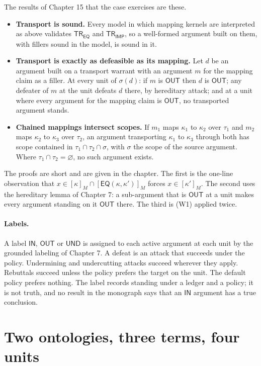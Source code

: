 \documentclass[11pt]{article}
\newcommand{\IN}{\textsf{IN}}
\newcommand{\UND}{\textsf{UND}}
\newcommand{\OUT}{\textsf{OUT}}
\newcommand{\EQ}{\mathsf{EQ}}
\newcommand{\IMP}{\mathsf{IMP}}
\newcommand{\TR}{\mathsf{TR}}
\newcommand{\ext}[2]{[#1]_{#2}}
\begin{document}
The results of Chapter 15 that the case exercises are these.
\begin{itemize}[nosep]
\item \textbf{Transport is sound.} Every model in which mapping kernels are interpreted as above validates $\TR_{\EQ}$ and $\TR_{\IMP}$, so a well-formed argument built on them, with fillers sound in the model, is sound in it.
\item \textbf{Transport is exactly as defeasible as its mapping.} Let $d$ be an argument built on a transport warrant with an argument $m$ for the mapping claim as a filler. At every unit of $\sigma(d)$: if $m$ is $\OUT$ then $d$ is $\OUT$; any defeater of $m$ at the unit defeats $d$ there, by hereditary attack; and at a unit where every argument for the mapping claim is $\OUT$, no transported argument stands.
\item \textbf{Chained mappings intersect scopes.} If $m_1$ maps $\kappa_1$ to $\kappa_2$ over $\tau_1$ and $m_2$ maps $\kappa_2$ to $\kappa_3$ over $\tau_2$, an argument transporting $\kappa_1$ to $\kappa_3$ through both has scope contained in $\tau_1\cap\tau_2\cap\sigma$, with $\sigma$ the scope of the source argument. Where $\tau_1\cap\tau_2=\varnothing$, no such argument exists.
\end{itemize}
The proofs are short and are given in the chapter. The first is the one-line observation that $x\in\ext{\kappa}{M}\cap\ext{\EQ(\kappa,\kappa')}{M}$ forces $x\in\ext{\kappa'}{M}$. The second uses the hereditary lemma of Chapter 7: a sub-argument that is $\OUT$ at a unit makes every argument standing on it $\OUT$ there. The third is (W1) applied twice.

\paragraph{Labels.} A label $\IN$, $\OUT$ or $\UND$ is assigned to each active argument at each unit by the grounded labeling of Chapter 7. A defeat is an attack that succeeds under the policy. Undermining and undercutting attacks succeed wherever they apply. Rebuttals succeed unless the policy prefers the target on the unit. The default policy prefers nothing. The label records standing under a ledger and a policy; it is not truth, and no result in the monograph says that an $\IN$ argument has a true conclusion.

\section{Two ontologies, three terms, four units}\label{sec:setup}
\end{document}
